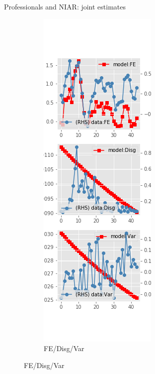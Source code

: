 \documentclass{beamer}
\begin{document}
\begin{frame}{Professionals and NIAR: joint estimates}
\begin{figure}[ht]
\begin{subfigure}[b]{0.2\textwidth}
		\end{subfigure}
		\hfill
		\begin{subfigure}[b]{0.2\textwidth}
			\caption{FE/Disg/Var}
			\includegraphics[width=\textwidth, height = 0.8\textheight]{figuresDraft/spf_ni_est_joint_diag3.png}
		\end{subfigure}
	\end{figure}
\end{frame}
\end{document}
